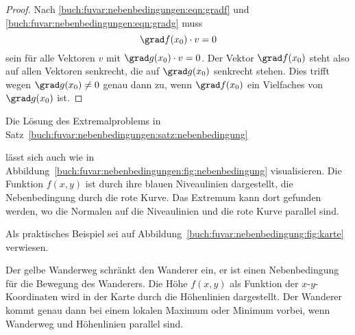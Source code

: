 \begin{proof}
Nach
\eqref{buch:fuvar:nebenbedingungen:eqn:gradf}
und
\eqref{buch:fuvar:nebenbedingungen:eqn:gradg}
muss 
\[
\grad f(x_0)\cdot v = 0
\]
sein für alle Vektoren $v$ mit $\grad g(x_0)\cdot v= 0$.
Der Vektor $\grad f(x_0)$ steht also auf allen Vektoren senkrecht, die
auf $\grad g(x_0)$ senkrecht stehen.
Dies trifft wegen $\grad g(x_0)\ne 0$ genau dann zu, wenn $\grad f(x_0)$
ein Vielfaches von $\grad g(x_0)$ ist.
\end{proof}

Die Lösung des Extremalproblems in
Satz~\ref{buch:fuvar:nebenbedingungen:satz:nebenbedingung}

lässt sich auch wie in
Abbildung~\ref{buch:fuvar:nebenbedingungen:fig:nebenbedingung}
visualisieren.
Die Funktion $f(x,y)$ ist durch ihre blauen Niveaulinien 
dargestellt, die Nebenbedingung durch die rote Kurve.
Das Extremum kann dort gefunden werden, wo die Normalen auf die
Niveaulinien und die rote Kurve parallel sind.

Als praktisches Beispiel sei auf
Abbildung~\ref{buch:fuvar:nebenbedingung:fig:karte}
verwiesen.

Der {\color{gelb}gelbe} Wanderweg schränkt den Wanderer ein,
er ist einen Nebenbedingung für die Bewegung des Wanderers.
Die Höhe $f(x,y)$ als Funktion der $x$-$y$-Koordinaten wird in
der Karte durch die Höhenlinien dargestellt.
Der Wanderer kommt genau dann bei einem lokalen Maximum oder
Minimum vorbei, wenn Wanderweg und Höhenlinien parallel sind.


